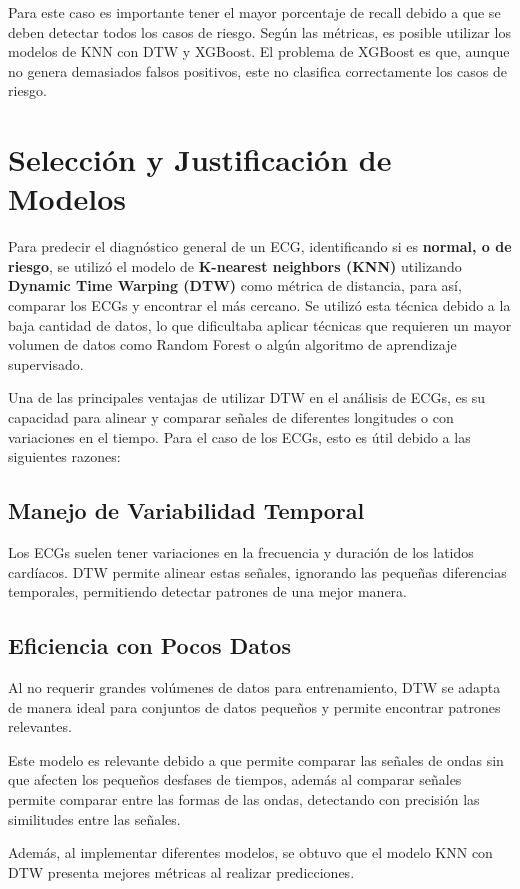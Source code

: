 \documentclass[conference]{IEEEtran}
\begin{document}
Para este caso es importante tener el mayor porcentaje de recall debido a que se deben detectar 
todos los casos de riesgo. Según las métricas, es posible utilizar los modelos de KNN con DTW y 
XGBoost. El problema de XGBoost es que, aunque no genera demasiados falsos positivos, este no 
clasifica correctamente los casos de riesgo.

\section{Selección y Justificación de Modelos}
Para predecir el diagnóstico general de un ECG, identificando si es \textbf{normal, o de riesgo}, se
 utilizó el modelo de \textbf{K-nearest neighbors (KNN)} utilizando \textbf{Dynamic Time Warping (DTW)}
  como métrica de distancia, para así, comparar los ECGs y encontrar el más cercano. 
Se utilizó esta técnica debido a la baja cantidad de datos, lo que dificultaba aplicar técnicas
 que requieren un mayor volumen de datos como Random Forest o algún algoritmo de aprendizaje supervisado.

Una de las principales ventajas de utilizar DTW en el análisis de ECGs, es su capacidad para alinear 
y comparar señales de diferentes longitudes o con variaciones en el tiempo. Para el caso de los ECGs,
 esto es útil debido a las siguientes razones:

\subsection{Manejo de Variabilidad Temporal}
Los ECGs suelen tener variaciones en la frecuencia y duración de los latidos cardíacos. DTW permite 
alinear estas señales, ignorando las pequeñas diferencias temporales, permitiendo detectar patrones
 de una mejor manera.

\subsection{Eficiencia con Pocos Datos}
Al no requerir grandes volúmenes de datos para entrenamiento, DTW se adapta de manera ideal para
 conjuntos de datos pequeños y permite encontrar patrones relevantes.

Este modelo es relevante debido a que permite comparar las señales de ondas sin que afecten los 
pequeños desfases de tiempos, además al comparar señales permite comparar entre las formas de las ondas, 
detectando con precisión las similitudes entre las señales. 

Además, al implementar diferentes modelos, se obtuvo que el modelo KNN con DTW presenta mejores 
métricas al realizar predicciones.
\end{document}
